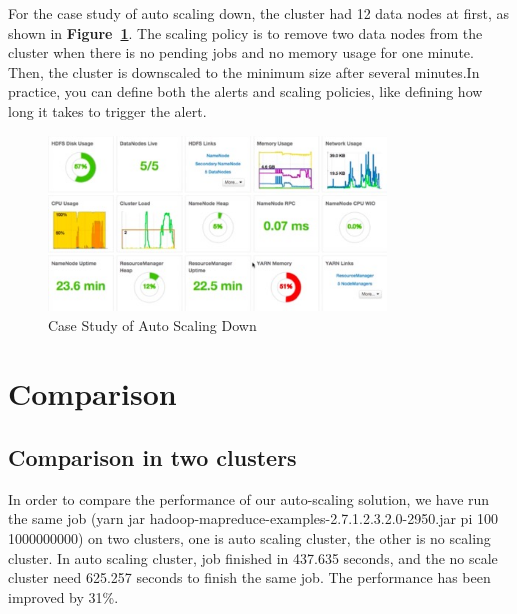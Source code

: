 \documentclass{article}
\begin{document}
For the case study of auto scaling down, the cluster had 12 data nodes at first, as shown in \textbf{Figure~\ref{fig:autoscalingdown}}. The scaling policy is to remove two data nodes from the cluster when there is no pending jobs and no memory usage for one minute. Then, the cluster is downscaled to the minimum size after several minutes.In practice, you can define both the alerts and scaling policies, like defining how long it takes to trigger the alert.
\begin{figure}[ht!]
 \centering
 \includegraphics[width=0.8\textwidth,natwidth=1000,natheight=800]{caseScaleDown.png}
 \caption{Case Study of Auto Scaling Down}
 \label{fig:autoscalingdown}
 \end{figure}
 
 \section{Comparison}
 \subsection{Comparison in two clusters}
In order to compare the performance of our auto-scaling solution, we have run the same job (yarn jar hadoop-mapreduce-examples-2.7.1.2.3.2.0-2950.jar pi 100 1000000000) on two clusters, one is auto scaling cluster, the other is no scaling cluster. In auto scaling cluster, job finished in 437.635 seconds, and the no scale cluster need 625.257 seconds to finish the same job. The performance has been improved by 31\%. 
\end{document}
